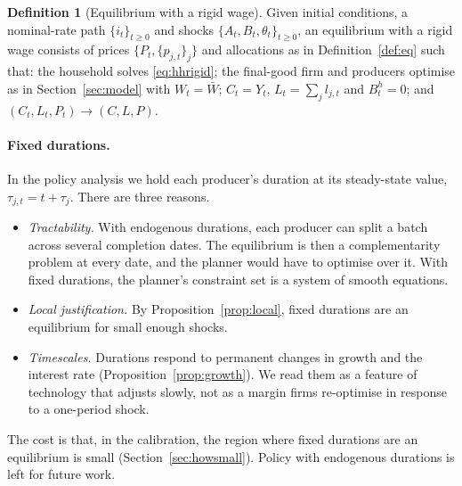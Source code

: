 \documentclass[11pt]{article}
\theoremstyle{definition}
\newtheorem{definition}{Definition}
\begin{document}
\begin{definition}[Equilibrium with a rigid wage]\label{def:eqrigid}
Given initial conditions, a nominal-rate path $\{i_t\}_{t\ge0}$ and shocks $\{A_t,B_t,\theta_t\}_{t\ge0}$,
an equilibrium with a rigid wage consists of prices $\{P_t,\{p_{j,t}\}_j\}$ and allocations as in
Definition~\ref{def:eq} such that: the household solves \eqref{eq:hhrigid}; the final-good firm and
producers optimise as in Section~\ref{sec:model} with $W_t=\bar W$; $C_t=Y_t$, $L_t=\sum_jl_{j,t}$ and
$B^h_t=0$; and $(C_t,L_t,P_t)\to(C,L,P)$.
\end{definition}

\paragraph{Fixed durations.} In the policy analysis we hold each producer's duration at its
steady-state value, $\tau_{j,t}=t+\tau_j$. There are three reasons.
\begin{itemize}
  \item \emph{Tractability.} With endogenous durations, each producer can split a batch across
        several completion dates. The equilibrium is then a complementarity problem at every date,
        and the planner would have to optimise over it. With fixed durations, the planner's
        constraint set is a system of smooth equations.
  \item \emph{Local justification.} By Proposition~\ref{prop:local}, fixed durations are an
        equilibrium for small enough shocks.
  \item \emph{Timescales.} Durations respond to permanent changes in growth and the interest rate
        (Proposition~\ref{prop:growth}). We read them as a feature of technology that adjusts slowly,
        not as a margin firms re-optimise in response to a one-period shock.
\end{itemize}
The cost is that, in the calibration, the region where fixed durations are an equilibrium is
small (Section~\ref{sec:howsmall}). Policy with endogenous durations is left for future work.
\end{document}
